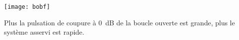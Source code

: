 \begin{marginfigure}[-2cm]
\centering
\texttt{[image: bobf]}
\end{marginfigure}

\begin{resultat}
Plus la pulsation de coupure à \SI{0}{dB} de la boucle ouverte est grande, plus le système asservi est rapide.
\end{resultat}







